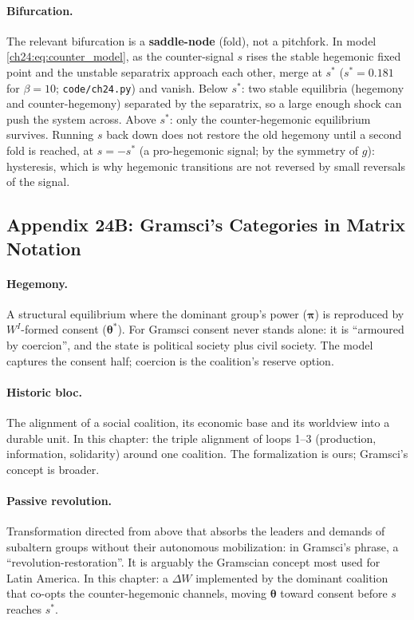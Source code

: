 \documentclass[../structural_economics_book.tex]{subfiles}
\begin{document}
\paragraph{Bifurcation.} The relevant bifurcation is a \textbf{saddle-node} (fold), not a pitchfork. In model \eqref{ch24:eq:counter_model}, as the counter-signal $s$ rises the stable hegemonic fixed point and the unstable separatrix approach each other, merge at $s^*$ ($s^* = 0.181$ for $\beta = 10$; \texttt{code/ch24.py}) and vanish. Below $s^*$: two stable equilibria (hegemony and counter-hegemony) separated by the separatrix, so a large enough shock can push the system across. Above $s^*$: only the counter-hegemonic equilibrium survives. Running $s$ back down does not restore the old hegemony until a second fold is reached, at $s = -s^*$ (a pro-hegemonic signal; by the symmetry of $g$): hysteresis, which is why hegemonic transitions are not reversed by small reversals of the signal.


\subsection*{Appendix 24B: Gramsci's Categories in Matrix Notation}
\label{ch24:app:gramsci}

\paragraph{Hegemony.} A structural equilibrium where the dominant group's power ($\boldsymbol{\pi}$) is reproduced by $W^I$-formed consent ($\boldsymbol{\theta}^*$). For Gramsci consent never stands alone: it is ``armoured by coercion'', and the state is political society plus civil society. The model captures the consent half; coercion is the coalition's reserve option.

\paragraph{Historic bloc.} The alignment of a social coalition, its economic base and its worldview into a durable unit. In this chapter: the triple alignment of loops 1--3 (production, information, solidarity) around one coalition. The formalization is ours; Gramsci's concept is broader.

\paragraph{Passive revolution.} Transformation directed from above that absorbs the leaders and demands of subaltern groups without their autonomous mobilization: in Gramsci's phrase, a ``revolution-restoration''. It is arguably the Gramscian concept most used for Latin America. In this chapter: a $\Delta W$ implemented by the dominant coalition that co-opts the counter-hegemonic channels, moving $\boldsymbol{\theta}$ toward consent before $s$ reaches $s^*$.
\end{document}
